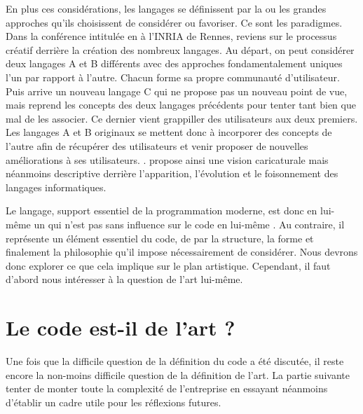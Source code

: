 \documentclass[12pt]{article} %
\begin{document}
En plus ces considérations, les langages se définissent par la ou les grandes approches qu'ils choisissent de considérer ou favoriser. Ce sont les paradigmes. Dans la conférence intitulée  en  à l'INRIA de Rennes, \citeauthor{GerardBerry2015} reviens sur le processus créatif derrière la création des nombreux langages. Au départ, on peut considérer deux langages A et B différents avec des approches fondamentalement uniques l'un par rapport à l'autre. Chacun forme sa propre communauté d'utilisateur. Puis arrive un nouveau langage C qui ne propose pas un nouveau point de vue, mais reprend les concepts des deux langages précédents pour tenter tant bien que mal de les associer. Ce dernier vient grappiller des utilisateurs aux deux premiers. Les langages A et B originaux se mettent donc à incorporer des concepts de l'autre afin de récupérer des utilisateurs et venir proposer de nouvelles améliorations à ses utilisateurs.  \cite{GerardBerry2015}. \citeauthor{GerardBerry2015} propose ainsi une vision caricaturale mais néanmoins descriptive derrière l'apparition, l'évolution et le foisonnement des langages informatiques.

Le langage, support essentiel de la programmation moderne, est donc en lui-même un  \cite{GerardBerry2015} qui n'est pas sans influence sur le code en lui-même \cite{Dijkstra1976}. Au contraire, il représente un élément essentiel du code, de par la structure, la forme et finalement la philosophie qu'il impose nécessairement de considérer. Nous devrons donc explorer ce que cela implique sur le plan artistique. Cependant, il faut d'abord nous intéresser à la question de l'art lui-même.

\section{Le code est-il de l'art ?}
Une fois que la difficile question de la définition du code a été discutée, il reste encore la non-moins difficile question de la définition de l'art. La partie suivante tenter de monter toute la complexité de l'entreprise en essayant néanmoins d'établir un cadre utile pour les réflexions futures.
\end{document}
